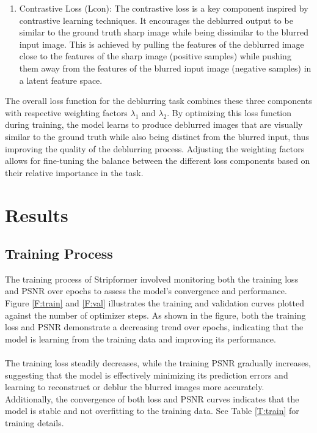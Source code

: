 \documentclass[12pt, a4paper, twoside]{article}
\begin{document}
\begin{itemize}
\begin{enumerate}
				\item Contrastive Loss (Lcon): The contrastive loss is a key component inspired by contrastive learning techniques. It encourages the deblurred output to be similar to the ground truth sharp image while being dissimilar to the blurred input image. This is achieved by pulling the features of the deblurred image close to the features of the sharp image (positive samples) while pushing them away from the features of the blurred input image (negative samples) in a latent feature space.
			\end{enumerate}
			
			The overall loss function for the deblurring task combines these three components with respective weighting factors $\lambda_1$ and $\lambda_2$. By optimizing this loss function during training, the model learns to produce deblurred images that are visually similar to the ground truth while also being distinct from the blurred input, thus improving the quality of the deblurring process. Adjusting the weighting factors allows for fine-tuning the balance between the different loss components based on their relative importance in the task.
		\end{itemize}
		
	\section{Results}
		\subsection{Training Process}
			The training process of Stripformer involved monitoring both the training loss and PSNR over epochs to assess the model's convergence and performance. Figure \ref{F:train} and \ref{F:val} illustrates the training and validation curves plotted against the number of optimizer steps. As shown in the figure, both the training loss and PSNR demonstrate a decreasing trend over epochs, indicating that the model is learning from the training data and improving its performance.
			\\
			\\
			The training loss steadily decreases, while the training PSNR gradually increases, suggesting that the model is effectively minimizing its prediction errors and learning to reconstruct or deblur the blurred images more accurately. Additionally, the convergence of both loss and PSNR curves indicates that the model is stable and not overfitting to the training data. See Table \ref{T:train} for training details.
			
\end{document}
